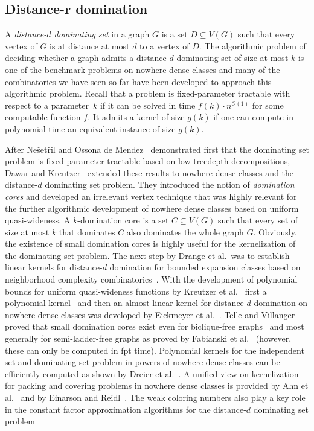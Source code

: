 \documentclass[1p,number,a4paper]{elsarticle}
\theoremstyle{remark}
\newcommand{\Oof}{\mathcal{O}}
\begin{document}
\subsection{Distance-r domination}

A \emph{distance-$d$ dominating set} in a graph $G$ is a set $D\subseteq V(G)$ such that every vertex of $G$ is at distance at most $d$ to a vertex of $D$. 
The algorithmic problem of deciding whether a graph admits a distance-$d$ dominating set of size at most $k$ is one of the benchmark problems on nowhere dense classes and many of the combinatorics we have seen so far have been developed to approach this algorithmic problem. 
Recall that a problem is fixed-parameter tractable with respect to a parameter~$k$ if it can be solved in time $f(k)\cdot n^{\Oof(1)}$ for some computable function $f$. It admits a kernel of size $g(k)$ if one can compute in polynomial time an equivalent instance of size $g(k)$.

After Ne\v{s}et\v{r}il and Ossona de Mendez~\cite{nevsetvril2008structural} demonstrated first that the dominating set problem is fixed-parameter tractable based on low treedepth decompositions,  
Dawar and Kreutzer~\cite{DawarK09} extended these results to nowhere dense classes and the distance-$d$ dominating set problem. 
They introduced the notion of \emph{domination cores} and developed an irrelevant vertex technique that was highly relevant for the further algorithmic development of nowhere dense classes based on uniform quasi-wideness. 
A $k$-domination core is a set $C\subseteq V(G)$ such that every set of size at most $k$ that dominates $C$ also dominates the whole graph $G$. 
Obviously, the existence of small domination cores is highly useful for the kernelization of the dominating set problem. 
The next step by Drange et al.\ was to establish linear kernels for distance-$d$ domination for bounded expansion classes based on neighborhood complexity combinatorics~\cite{DrangeDFKLPPRVS16}. 
With the development of polynomial bounds for uniform quasi-wideness functions by Kreutzer et al.~\cite{kreutzer2018polynomial} first a polynomial kernel~\cite{kreutzer2018polynomial} and then an almost linear kernel for distance-$d$ domination on nowhere dense classes was developed by Eickmeyer et al.~\cite{EickmeyerGKKPRS17}. 
Telle and Villanger proved that small domination cores exist even for biclique-free graphs~\cite{telle2012fpt} and most generally for semi-ladder-free graphs as proved by Fabianski et al.~\cite{FabianskiPST19} (however, these can only be computed in fpt time). 
Polynomial kernels for the independent set and dominating set problem
in powers of nowhere dense classes can be efficiently computed as shown by Dreier et al.~\cite{dreier2022combinatorial}. 
A unified view on kernelization for packing and covering problems in nowhere dense classes is provided by Ahn et al.~\cite{AhnKK23} and by Einarson and Reidl~\cite{EinarsonR20}. 
The weak coloring numbers also play a key role in the constant factor approximation algorithms for the distance-$d$ dominating set problem~\cite{akhoondian2018distributed,dvovrak2013constant,dvovrak2019distance,kreutzer2017structural,pilipczuk2021kernelization}
\end{document}
